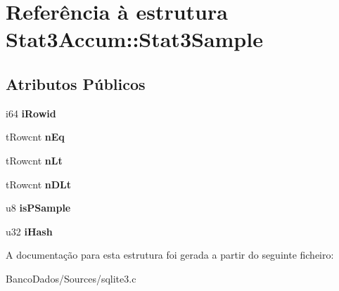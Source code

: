 \hypertarget{struct_stat3_accum_1_1_stat3_sample}{\section{Referência à estrutura Stat3\-Accum\-:\-:Stat3\-Sample}
\label{struct_stat3_accum_1_1_stat3_sample}
}
\subsection*{Atributos Públicos}
\begin{DoxyCompactItemize}
\item 
\hypertarget{struct_stat3_accum_1_1_stat3_sample_a5815d8421fb58c864b3d5e42df902e88}{i64 {\bfseries i\-Rowid}}\label{struct_stat3_accum_1_1_stat3_sample_a5815d8421fb58c864b3d5e42df902e88}

\item 
\hypertarget{struct_stat3_accum_1_1_stat3_sample_a91c387125f80023df372d3c4c19616b3}{t\-Rowcnt {\bfseries n\-Eq}}\label{struct_stat3_accum_1_1_stat3_sample_a91c387125f80023df372d3c4c19616b3}

\item 
\hypertarget{struct_stat3_accum_1_1_stat3_sample_aff2cb8657111e4084eea1e10e65938cc}{t\-Rowcnt {\bfseries n\-Lt}}\label{struct_stat3_accum_1_1_stat3_sample_aff2cb8657111e4084eea1e10e65938cc}

\item 
\hypertarget{struct_stat3_accum_1_1_stat3_sample_abc3c2023b9794646be59f695c9b85db2}{t\-Rowcnt {\bfseries n\-D\-Lt}}\label{struct_stat3_accum_1_1_stat3_sample_abc3c2023b9794646be59f695c9b85db2}

\item 
\hypertarget{struct_stat3_accum_1_1_stat3_sample_a48bf958cce34aca54f30b69680558262}{u8 {\bfseries is\-P\-Sample}}\label{struct_stat3_accum_1_1_stat3_sample_a48bf958cce34aca54f30b69680558262}

\item 
\hypertarget{struct_stat3_accum_1_1_stat3_sample_a3f1a7033f005705c0df65db3db626ffb}{u32 {\bfseries i\-Hash}}\label{struct_stat3_accum_1_1_stat3_sample_a3f1a7033f005705c0df65db3db626ffb}

\end{DoxyCompactItemize}


A documentação para esta estrutura foi gerada a partir do seguinte ficheiro\-:\begin{DoxyCompactItemize}
\item 
Banco\-Dados/\-Sources/sqlite3.\-c\end{DoxyCompactItemize}
